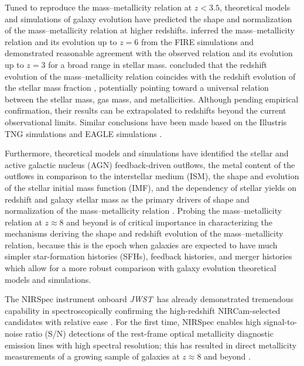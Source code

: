 \documentclass[twocolumn]{aastex631}
\newcommand{\jwst}{{\em JWST}}
\begin{document}
Tuned to reproduce the mass--metallicity relation at $z < 3.5$, theoretical models and simulations of galaxy evolution have predicted the shape and normalization of the mass--metallicity relation at higher redshifts. 
\cite{ma+2016} inferred the mass--metallicity relation and its evolution up to
$z = 6 $ from the FIRE simulations and demonstrated reasonable agreement with the observed relation and its evolution up to $z = 3$ for a broad range in stellar mass.
\cite{ma+2016} concluded that the redshift evolution of the mass--metallicity relation coincides with the redshift evolution of the stellar mass fraction \citep[see, e.g.,][]{UM1, UM2, UM3}, potentially pointing toward a universal relation between the stellar mass, gas mass, and metallicities. 
Although pending empirical confirmation, their results can be extrapolated to redshifts beyond the current observational limits.  
Similar conclusions have been made based on the Illustris TNG simulations \citep{2019MNRAS.484.5587T} and EAGLE simulations \citep{2015MNRAS.446..521S, 2016MNRAS.459.2632L, 2017MNRAS.472.3354D}.


Furthermore, theoretical models and simulations have identified the stellar and active galactic nucleus (AGN) feedback-driven outflows, the metal content of the outflows in comparison to the interstellar medium (ISM), the shape and evolution of the stellar initial mass function (IMF), and the dependency of stellar yields on redshift and galaxy stellar mass as the primary drivers of shape and normalization of the mass--metallicity relation \citep[see, e.g.,][and references therein]{2018MNRAS.474.1143L}. 
Probing the mass--metallicity relation at $z \approx 8$ and beyond is of critical importance in characterizing the mechanisms deriving the shape and redshift evolution of the mass--metallicity relation, because this is the epoch when galaxies are expected to have much simpler star-formation histories (SFHs), feedback histories, and merger histories which allow for a more robust comparison with galaxy evolution theoretical models and simulations.

The NIRSpec instrument onboard \jwst\ has already demonstrated tremendous capability in spectroscopically confirming the high-redshift NIRCam-selected candidates with relative ease \citep[see, e.g.,][]{carnall+2022, williams+2022, 2022arXiv221015639R, 2022arXiv221109097M}.
For the first time, NIRSpec enables high signal-to-noise ratio (S/N) detections of the rest-frame optical metallicity diagnostic emission lines with high spectral resolution; this has resulted in direct metallicity measurements of a growing sample of galaxies at $z \approx 8$ and beyond \citep[see, e.g.,][]{curti+2022, schaerer+2022, williams+2022}. 
\end{document}
